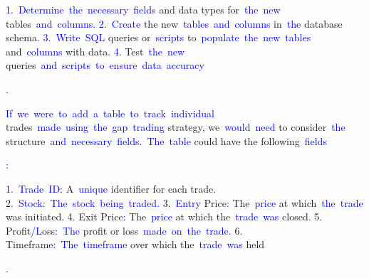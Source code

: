 \documentclass{article}
\begin{document}
\begin{tcolorbox}[colframe=black,colback=white]
{}\textcolor{blue}{1}\textcolor{blue}{.}\textcolor{blue}{~Determine}\textcolor{blue}{~the}\textcolor{blue}{~necessary}\textcolor{blue}{~fields} and data types for\textcolor{blue}{~the}\textcolor{blue}{~new} tables\textcolor{blue}{~and}\textcolor{blue}{~columns}\textcolor{blue}{.
}\textcolor{blue}{2}.\textcolor{blue}{~Create} the new\textcolor{blue}{~tables}\textcolor{blue}{~and}\textcolor{blue}{~columns} in\textcolor{blue}{~the} database schema\textcolor{blue}{.
}\textcolor{blue}{3}.\textcolor{blue}{~Write}\textcolor{blue}{~SQL} queries or\textcolor{blue}{~scripts} to\textcolor{blue}{~populate}\textcolor{blue}{~the}\textcolor{blue}{~new}\textcolor{blue}{~tables} and\textcolor{blue}{~columns} with data\textcolor{blue}{.
}\textcolor{blue}{4}. Test\textcolor{blue}{~the}\textcolor{blue}{~new} queries\textcolor{blue}{~and}\textcolor{blue}{~scripts}\textcolor{blue}{~to}\textcolor{blue}{~ensure}\textcolor{blue}{~data}\textcolor{blue}{~accuracy}\textcolor{blue}{.

}\textcolor{blue}{If}\textcolor{blue}{~we}\textcolor{blue}{~were}\textcolor{blue}{~to}\textcolor{blue}{~add}\textcolor{blue}{~a}\textcolor{blue}{~table}\textcolor{blue}{~to}\textcolor{blue}{~track}\textcolor{blue}{~individual} trades\textcolor{blue}{~made}\textcolor{blue}{~using}\textcolor{blue}{~the}\textcolor{blue}{~gap}\textcolor{blue}{~trading} strategy\textcolor{blue}{,} we\textcolor{blue}{~would}\textcolor{blue}{~need} to consider\textcolor{blue}{~the} structure\textcolor{blue}{~and}\textcolor{blue}{~necessary}\textcolor{blue}{~fields}\textcolor{blue}{.}\textcolor{blue}{~The}\textcolor{blue}{~table} could have the following\textcolor{blue}{~fields}\textcolor{blue}{:

}\textcolor{blue}{1}.\textcolor{blue}{~Trade}\textcolor{blue}{~ID}: A\textcolor{blue}{~unique} identifier for each trade.
2.\textcolor{blue}{~Stock}:\textcolor{blue}{~The}\textcolor{blue}{~stock}\textcolor{blue}{~being}\textcolor{blue}{~traded}\textcolor{blue}{.
}3.\textcolor{blue}{~Entry} Price\textcolor{blue}{:} The\textcolor{blue}{~price} at which\textcolor{blue}{~the}\textcolor{blue}{~trade} was initiated\textcolor{blue}{.
}4. Exit Price\textcolor{blue}{:} The\textcolor{blue}{~price} at which the\textcolor{blue}{~trade}\textcolor{blue}{~was} closed\textcolor{blue}{.
}5. Profit\textcolor{blue}{/L}oss\textcolor{blue}{:}\textcolor{blue}{~The} profit or loss\textcolor{blue}{~made}\textcolor{blue}{~on}\textcolor{blue}{~the}\textcolor{blue}{~trade}\textcolor{blue}{.
}6. Timeframe\textcolor{blue}{:}\textcolor{blue}{~The}\textcolor{blue}{~timeframe} over which the\textcolor{blue}{~trade}\textcolor{blue}{~was} held\textcolor{blue}{.

}
\end{tcolorbox}
\end{document}
